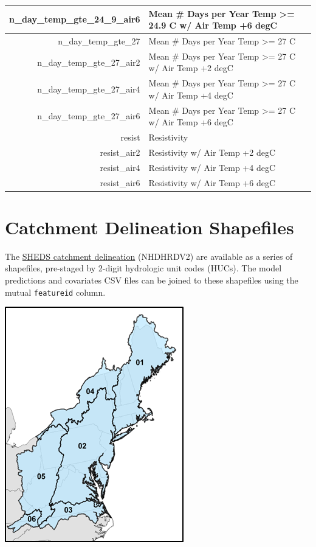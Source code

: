 \documentclass[]{book}
\begin{document}
\begin{tabular}{r|l}
n\_day\_temp\_gte\_24\_9\_air6 & Mean \# Days per Year Temp >= 24.9 C w/ Air Temp +6 degC\\
\hline
n\_day\_temp\_gte\_27 & Mean \# Days per Year Temp >= 27 C\\
\hline
n\_day\_temp\_gte\_27\_air2 & Mean \# Days per Year Temp >= 27 C w/ Air Temp +2 degC\\
\hline
n\_day\_temp\_gte\_27\_air4 & Mean \# Days per Year Temp >= 27 C w/ Air Temp +4 degC\\
\hline
n\_day\_temp\_gte\_27\_air6 & Mean \# Days per Year Temp >= 27 C w/ Air Temp +6 degC\\
\hline
resist & Resistivity\\
\hline
resist\_air2 & Resistivity w/ Air Temp +2 degC\\
\hline
resist\_air4 & Resistivity w/ Air Temp +4 degC\\
\hline
resist\_air6 & Resistivity w/ Air Temp +6 degC\\
\hline
\end{tabular}

\hypertarget{catchment-delineation-shapefiles}{%
\section{Catchment Delineation Shapefiles}\label{catchment-delineation-shapefiles}}

The \href{https://conte-ecology.github.io/shedsGisData/}{SHEDS catchment delineation} (NHDHRDV2) are available as a series of shapefiles, pre-staged by 2-digit hydrologic unit codes (HUCs). The model predictions and covariates CSV files can be joined to these shapefiles using the mutual \texttt{featureid} column.

\includegraphics{img/hydrologic-regions.png}
\end{document}
